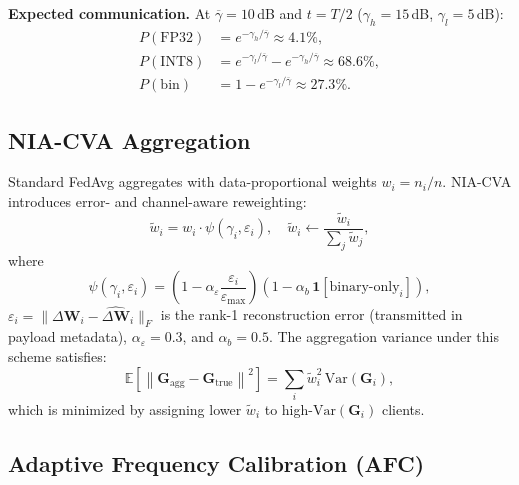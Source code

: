 \documentclass[conference]{IEEEtran}
\begin{document}
\textbf{Expected communication.} At $\overline{\gamma}=10$\,dB and $t=T/2$ ($\gamma_h=15$\,dB, $\gamma_l=5$\,dB):
\begin{align}
    P(\mathrm{FP32}) &= e^{-\gamma_h/\overline{\gamma}} \approx 4.1\%, \\
    P(\mathrm{INT8}) &= e^{-\gamma_l/\overline{\gamma}} - e^{-\gamma_h/\overline{\gamma}} \approx 68.6\%, \\
    P(\mathrm{bin}) &= 1 - e^{-\gamma_l/\overline{\gamma}} \approx 27.3\%.
\end{align}

\subsection{NIA-CVA Aggregation}

Standard FedAvg aggregates with data-proportional weights $w_i = n_i/n$. NIA-CVA introduces error- and channel-aware reweighting:
\begin{equation}
    \tilde{w}_i = w_i\cdot\psi(\gamma_i, \varepsilon_i), \quad
    \tilde{w}_i \leftarrow \frac{\tilde{w}_i}{\sum_j \tilde{w}_j},
\end{equation}
where
\begin{equation}
    \psi(\gamma_i, \varepsilon_i) = \left(1 - \alpha_\varepsilon \frac{\varepsilon_i}{\varepsilon_{\max}}\right)\!\left(1 - \alpha_b\,\mathbf{1}[\text{binary-only}_i]\right),
\end{equation}
$\varepsilon_i = \|\Delta\mathbf{W}_i - \widehat{\Delta\mathbf{W}}_i\|_F$ is the rank-1 reconstruction error (transmitted in payload metadata), $\alpha_\varepsilon = 0.3$, and $\alpha_b = 0.5$. The aggregation variance under this scheme satisfies:
\begin{equation}
    \mathbb{E}\!\left[\left\|\mathbf{G}_{\mathrm{agg}} - \mathbf{G}_{\mathrm{true}}\right\|^2\right] = \sum_i \tilde{w}_i^2\,\mathrm{Var}(\mathbf{G}_i),
\end{equation}
which is minimized by assigning lower $\tilde{w}_i$ to high-$\mathrm{Var}(\mathbf{G}_i)$ clients.

\subsection{Adaptive Frequency Calibration (AFC)}
\end{document}
